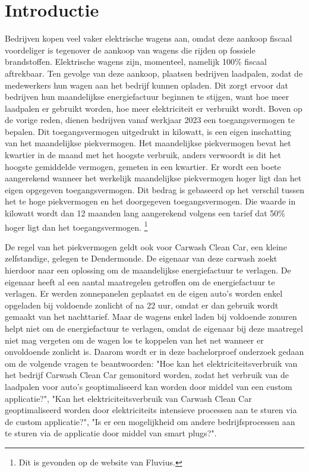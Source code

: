 
\section{Introductie}%
\label{sec:introductie}

Bedrijven kopen veel vaker elektrische wagens aan, omdat deze aankoop fiscaal voordeliger is tegenover de aankoop van wagens die rijden op fossiele brandstoffen. Elektrische wagens zijn, momenteel, namelijk 100\% fiscaal aftrekbaar. Ten gevolge van deze aankoop, plaatsen bedrijven laadpalen, zodat de medewerkers hun wagen aan het bedrijf kunnen opladen. Dit zorgt ervoor dat bedrijven hun maandelijkse energiefactuur beginnen te stijgen, want hoe meer laadpalen er gebruikt worden, hoe meer elektriciteit er verbruikt wordt. Boven op de vorige reden, dienen bedrijven vanaf werkjaar 2023 een toegangsvermogen te bepalen. Dit toegangsvermogen uitgedrukt in kilowatt, is een eigen inschatting van het maandelijkse piekvermogen. Het maandelijkse piekvermogen bevat het kwartier in de maand met het hoogste verbruik, anders verwoordt is dit het hoogste gemiddelde vermogen, gemeten in een kwartier. Er wordt een boete aangerekend wanneer het werkelijk maandelijkse piekvermogen hoger ligt dan het eigen opgegeven toegangsvermogen. Dit bedrag is gebaseerd op het verschil tussen het te hoge piekvermogen en het doorgegeven toegangsvermogen. Die waarde in kilowatt wordt dan 12 maanden lang aangerekend volgens een tarief dat 50\% hoger ligt dan het toegangsvermogen. \footnote{Dit is gevonden op de website van Fluvius.}

De regel van het piekvermogen geldt ook voor Carwash Clean Car, een kleine zelfstandige, gelegen te Dendermonde. De eigenaar van deze carwash zoekt hierdoor naar een oplossing om de maandelijkse energiefactuur te verlagen. De eigenaar heeft al een aantal maatregelen getroffen om de energiefactuur te verlagen. Er werden zonnepanelen geplaatst en de eigen auto's worden enkel opgeladen bij voldoende zonlicht of na 22 uur, omdat er dan gebruik wordt gemaakt van het nachttarief. Maar de wagens enkel laden bij voldoende zonuren helpt niet om de energiefactuur te verlagen, omdat de eigenaar bij deze maatregel niet mag vergeten om de wagen los te koppelen van het net wanneer er onvoldoende zonlicht is. Daarom wordt er in deze bachelorproef onderzoek gedaan om de volgende vragen te beantwoorden: "Hoe kan het elektriciteitsverbruik van het bedrijf Carwash Clean Car gemonitord worden, zodat het verbruik van de laadpalen voor auto's geoptimaliseerd kan worden door middel van een custom applicatie?", "Kan het elektriciteitsverbruik van Carwash Clean Car geoptimaliseerd worden door elektriciteits intensieve processen aan te sturen via de custom applicatie?", "Is er een mogelijkheid om andere bedrijfsprocessen aan te sturen via de applicatie door middel van smart plugs?".

